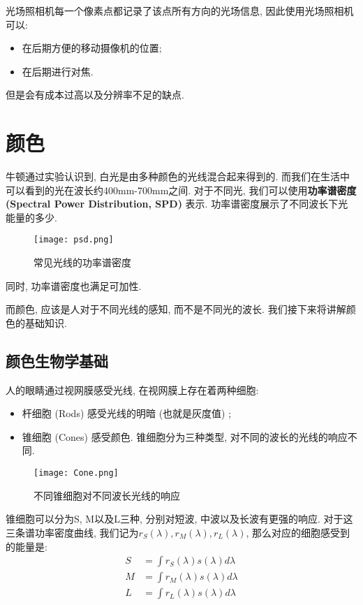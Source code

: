 \documentclass[openany]{progbookcn}
\begin{document}
光场照相机每一个像素点都记录了该点所有方向的光场信息, 因此使用光场照相机可以: 
\begin{itemize}
	\item 在后期方便的移动摄像机的位置; 
	\item 在后期进行对焦. 
\end{itemize}

但是会有成本过高以及分辨率不足的缺点. 

\chapter{颜色}

牛顿通过实验认识到, 白光是由多种颜色的光线混合起来得到的. 而我们在生活中可以看到的光在波长约400mm-700mm之间. 对于不同光, 我们可以使用\textbf{功率谱密度 (Spectral Power Distribution, SPD) }表示. 功率谱密度展示了不同波长下光能量的多少. 

\begin{figure}[H]
	\centering
	\texttt{[image: psd.png]}
	\caption{常见光线的功率谱密度}
	\label{fig:psd}
\end{figure}

同时, 功率谱密度也满足可加性. 

而颜色, 应该是人对于不同光线的感知, 而不是不同光的波长. 我们接下来将讲解颜色的基础知识. 

\section{颜色生物学基础}

人的眼睛通过视网膜感受光线, 在视网膜上存在着两种细胞: 
\begin{itemize}
	\item 杆细胞 (Rods) 感受光线的明暗 (也就是灰度值) ; 
	\item 锥细胞 (Cones) 感受颜色. 锥细胞分为三种类型, 对不同的波长的光线的响应不同. 
\end{itemize}

\begin{figure}[H]
	\centering
	\texttt{[image: Cone.png]}
	\caption{不同锥细胞对不同波长光线的响应}
	\label{fig:Cone}
\end{figure}

锥细胞可以分为S, M以及L三种, 分别对短波, 中波以及长波有更强的响应. 对于这三条谱功率密度曲线, 我们记为$r_S(\lambda),r_M(\lambda),r_L(\lambda)$, 那么对应的细胞感受到的能量是: 
\begin{equation}
	\begin{split}
		S &=\int r_{S}(\lambda) s(\lambda) d \lambda \\
		M &=\int r_{M}(\lambda) s(\lambda) d \lambda \\
		L &=\int r_{L}(\lambda) s(\lambda) d \lambda
	\end{split}
\end{equation}
\end{document}
